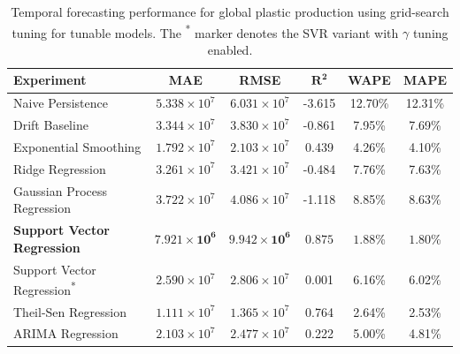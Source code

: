 \begin{table}[!ht]
	\centering
	\caption{
		\centering Temporal forecasting performance for global plastic production using grid-search tuning for tunable models. The \textsuperscript{*} marker denotes the SVR variant with \(\gamma\) tuning enabled.
	}
	\begin{tabular}{@{}lccccc@{}}
		\toprule
		\textbf{Experiment}                          & \textbf{MAE}                   & \textbf{RMSE}                  & $\mathbf{R^2}$     & \textbf{WAPE}       & \textbf{MAPE}       \\
		\midrule
		Naive Persistence                            & \(5.338 \times 10^7\)          & \(6.031 \times 10^7\)          & -3.615             & 12.70\%             & 12.31\%             \\
		Drift Baseline                               & \(3.344 \times 10^7\)          & \(3.830 \times 10^7\)          & -0.861             & 7.95\%              & 7.69\%              \\
		Exponential Smoothing                        & \(1.792 \times 10^7\)          & \(2.103 \times 10^7\)          & 0.439              & 4.26\%              & 4.10\%              \\
		Ridge Regression                             & \(3.261 \times 10^7\)          & \(3.421 \times 10^7\)          & -0.484             & 7.76\%              & 7.63\%              \\
		Gaussian Process Regression                  & \(3.722 \times 10^7\)          & \(4.086 \times 10^7\)          & -1.118             & 8.85\%              & 8.63\%              \\
		\textbf{Support Vector Regression}           & \(\mathbf{7.921 \times 10^6}\) & \(\mathbf{9.942 \times 10^6}\) & \(\mathbf{0.875}\) & \(\mathbf{1.88}\)\% & \(\mathbf{1.80}\)\% \\
		Support Vector Regression\textsuperscript{*} & \(2.590 \times 10^7\)          & \(2.806 \times 10^7\)          & 0.001              & 6.16\%              & 6.02\%              \\
		Theil-Sen Regression                         & \(1.111 \times 10^7\)          & \(1.365 \times 10^7\)          & 0.764              & 2.64\%              & 2.53\%              \\
		ARIMA Regression                             & \(2.103 \times 10^7\)          & \(2.477 \times 10^7\)          & 0.222              & 5.00\%              & 4.81\%              \\
		\hline
	\end{tabular}
	\label{tab:global_forecasting_grid_search_metric_table}
\end{table}

